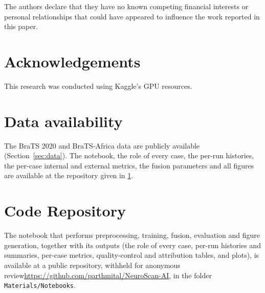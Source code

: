 \documentclass[a4paper,fleqn]{cas-sc}
\begin{document}
The authors declare that they have no known competing financial interests or personal relationships that could have appeared to influence the work reported in this paper.

\section*{Acknowledgements}

This research was conducted using Kaggle's GPU resources.

\section*{Data availability}

The BraTS 2020 and BraTS-Africa data are publicly available (Section~\ref{sec:data}). The notebook, the role of every case, the per-run histories, the per-case internal and external metrics, the fusion parameters and all figures are available at the repository given in \ref{app:code}.

\appendix

\section{Code Repository}
\label{app:code}

The notebook that performs preprocessing, training, fusion, evaluation and figure generation, together with its outputs (the role of every case, per-run histories and summaries, per-case metrics, quality-control and attribution tables, and plots), is available at \ifdefined\Anonymised a public repository, withheld for anonymous review\else\url{https://github.com/parthmital/NeuroScan-AI}, in the folder \texttt{Materials/Notebooks}\fi.


\ifdefined\NoReferences
\renewenvironment{thebibliography}[1]{\setbox0=\vbox\bgroup\list{}{}}{\endlist\egroup}
\fi

\end{document}
